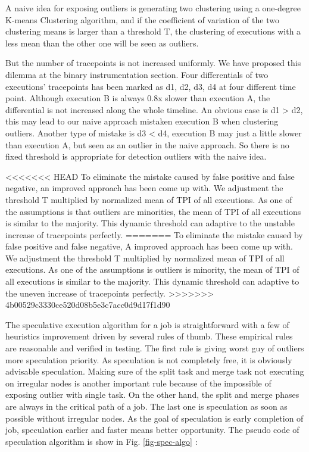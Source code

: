 A naive idea for exposing outliers is generating two clustering using a one-degree K-means Clustering algorithm, and if the coefficient of variation of the two clustering means is larger than a threshold T, the clustering of executions with a less mean than the other one  will be seen as outliers.

But the number of tracepoints is not increased uniformly. We have proposed this dilemma at the binary instrumentation section. Four differentials of two executions’ tracepoints has been marked as d1, d2, d3, d4 at four different time point. Although execution B is always 0.8x slower than execution A, the differential is not increased along the whole timeline. An obvious case is d1 > d2, this may lead to our naive approach mistaken execution B when clustering outliers. Another type of mistake is d3 < d4, execution B may just a little slower than execution A, but seen as an outlier in the naive approach. So there is no fixed threshold is appropriate for detection outliers with the naive idea.

<<<<<<< HEAD
To eliminate  the mistake caused by false positive and false negative, an improved approach has been come up with. We adjustment the threshold T multiplied by normalized mean of TPI of all executions. As one of the assumptions is that outliers are minorities, the mean of TPI of all executions is similar to the majority. This dynamic threshold can adaptive to the unstable increase of tracepoints perfectly.
=======
To eliminate  the mistake caused by false positive and false negative, A improved approach has been come up with. We adjustment the threshold T multiplied by normalized mean of TPI of all executions. As one of the assumptions is outliers is minority, the mean of TPI of all executions is similar to the majority. This dynamic threshold can adaptive to the uneven increase of tracepoints perfectly.
>>>>>>> 4b00529c3330ce520d08b5e3c7acc0d9d17f1d90

The speculative execution algorithm for a job is straightforward with a few of heuristics improvement driven by several rules of thumb. These empirical rules are reasonable and verified in testing. The first rule is giving worst guy of outliers more speculation priority. As speculation is not completely free, it is obviously advisable speculation. Making sure of the split task and merge task not executing on irregular nodes is another important rule because of the impossible of exposing outlier with single task. On the other hand, the split and merge phases are always in the critical path of a job. The last one is speculation as soon as possible without irregular nodes. As the goal of speculation is early completion of job, speculation earlier and faster means better opportunity. The pseudo code of speculation algorithm is show in Fig. \ref{fig-spec-algo} :

